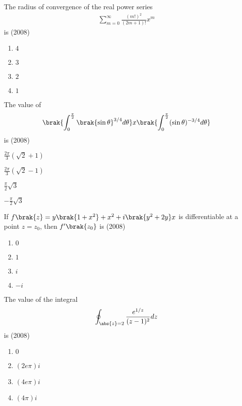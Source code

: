 	\item The radius of convergence of the real power series
             \begin{align*}
		\sum_{m=0}^{\infty} \frac{(m!)^{2}}{(2 m+1)!} x^{m} 
             \end{align*}
		is
		\hfill{(2008)}
		\begin{enumerate}
			\item $4$
            \item $3$
            \item $2$
            \item $1$
        	\end{enumerate}	
	\item  The value of
           \begin{align*}
		\brak{\int_{0}^{\frac{\pi}{2}}\brak{\sin \theta}^{3 / 4} d \theta} x\brak{\int_{0}^{\frac{\pi}{2}}(\sin \theta)^{-3 / 4} d \theta}
             \end{align*}
             is
             \hfill{(2008)}
		\begin{enumerate}
            \begin{multicols}{2}
			\item $\frac{2 \pi}{3}(\sqrt{2}+1)$
			\item $\frac{2 \pi}{3}(\sqrt{2}-1)$
			\item $\frac{\pi}{2} \sqrt{3}$
			\item $-\frac{\pi}{2} \sqrt{3}$
   \end{multicols}
        	\end{enumerate}	
	\item If $f\brak{z}=y\brak{1+x^{2}}+x^{2}+i\brak{y^{2}+2 y} x$ is differentiable at a point $z=z_{0}$, then $f'\brak{z_{0}}$ is
	\hfill{(2008)}
                \begin{enumerate}
			\item $0$
			\item $1$
			\item $i$
			\item $-i$
        	\end{enumerate}		
	\item The value of the integral
        \begin{align*}
            \oint_{\abs{z}=2} \frac{e^{1 / z}}{(z-1)^{2}} d z
        \end{align*}
        is
        \hfill{(2008)}
		\begin{enumerate}
			\item $0$
			\item $(2 e \pi) i$
			\item $(4 e \pi) i$
			\item $(4 \pi) i$
        	\end{enumerate}	
